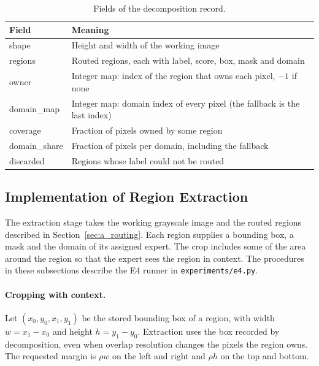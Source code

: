 \documentclass{FastFyp}
\begin{document}
\begin{table}[!ht]
\centering
\caption{Fields of the decomposition record.}
\label{tab:a_record}
\begin{tabular}{|l|p{9cm}|}
\hline
\textbf{Field} & \textbf{Meaning} \\ \hline
shape & Height and width of the working image \\ \hline
regions & Routed regions, each with label, score, box, mask and domain \\ \hline
owner & Integer map: index of the region that owns each pixel, $-1$ if none \\ \hline
domain\_map & Integer map: domain index of every pixel (the fallback is the last index) \\ \hline
coverage & Fraction of pixels owned by some region \\ \hline
domain\_share & Fraction of pixels per domain, including the fallback \\ \hline
discarded & Regions whose label could not be routed \\ \hline
\end{tabular}
\end{table}

\subsection{Implementation of Region Extraction}
\label{sec:b_extraction}
The extraction stage takes the working grayscale image and the routed regions
described in Section~\ref{sec:a_routing}. Each region supplies a bounding box, a
mask and the domain of its assigned expert. The crop includes some of the area
around the region so that the expert sees the region in context. The procedures
in these subsections describe the E4 runner in \texttt{experiments/e4.py}.

\paragraph{Cropping with context.} Let $(x_0,y_0,x_1,y_1)$ be the stored bounding
box of a region, with width $w=x_1-x_0$ and height $h=y_1-y_0$. Extraction uses
the box recorded by decomposition, even when overlap resolution changes the
pixels the region owns. The requested margin is $\rho w$ on the left and right
and $\rho h$ on the top and bottom.
\end{document}
